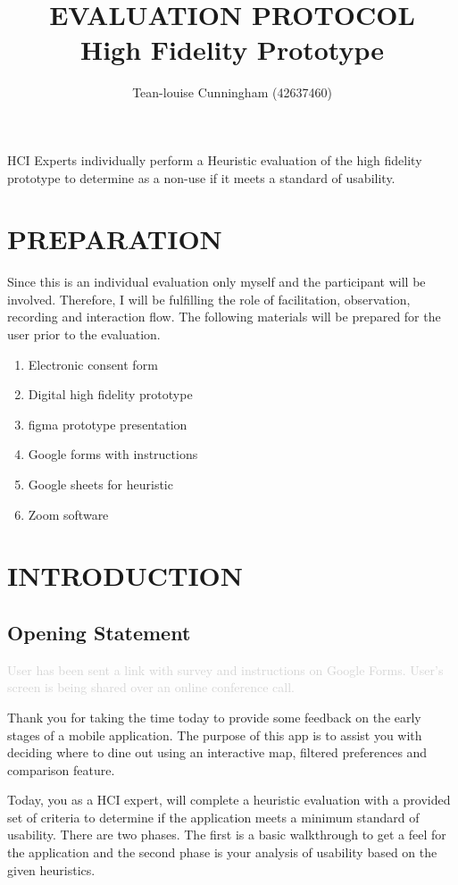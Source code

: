 \documentclass[a4 paper, 10pt]{article}
\title{\textbf{EVALUATION PROTOCOL \\ High Fidelity Prototype}}
\author{Tean-louise Cunningham (42637460)}
\date{}
\begin{document}
\maketitle
\begin{center}
HCI Experts individually perform a Heuristic evaluation of the high fidelity prototype to determine as a non-use if it meets a standard of usability.
\end{center}

\section*{PREPARATION}
Since this is an individual evaluation only myself and the participant will be involved. Therefore, I will be fulfilling the role of facilitation, observation, recording and interaction flow. The following materials will be prepared for the user prior to the evaluation.

    \begin{multicols}{2}
        \begin{enumerate}
            \item Electronic consent form
            \item Digital high fidelity prototype
            \item figma prototype presentation
            \item Google forms with instructions
            \item Google sheets for heuristic
            \item Zoom software
        \end{enumerate}
    \end{multicols}

\section*{INTRODUCTION}

    \subsection*{Opening Statement}

        \textcolor{lightgray}{User has been sent a link with survey and instructions on Google Forms. User’s screen is being shared over an online conference call.}

        \begin{itshape}
            Thank you for taking the time today to provide some feedback on the early stages of a mobile application. The purpose of this app is to assist you with deciding where to dine out using an interactive map, filtered preferences and comparison feature.

            Today, you as a HCI expert, will complete a heuristic evaluation with a provided set of criteria to determine if the application meets a minimum standard of usability. There are two phases. The first is a basic walkthrough to get a feel for the application and the second phase is your analysis of usability based on the given heuristics.
        \end{itshape}
\end{document}
